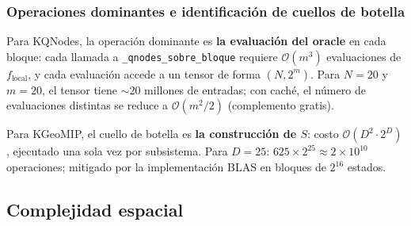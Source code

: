 \subsubsection*{Operaciones dominantes e identificación de cuellos de botella}

Para KQNodes, la operación dominante es \textbf{la evaluación del oracle} en cada bloque:
cada llamada a \texttt{\_qnodes\_sobre\_bloque} requiere $\mathcal{O}(m^3)$ evaluaciones
de $f_{\text{local}}$, y cada evaluación accede a un tensor de forma $(N, 2^m)$.
Para $N=20$ y $m=20$, el tensor tiene $\sim$20 millones de entradas; con caché, el número
de evaluaciones distintas se reduce a $\mathcal{O}(m^2/2)$ (complemento gratis).

Para KGeoMIP, el cuello de botella es \textbf{la construcción de $S$}: costo
$\mathcal{O}(D^2 \cdot 2^D)$, ejecutado una sola vez por subsistema. Para $D=25$:
$625 \times 2^{25} \approx 2 \times 10^{10}$ operaciones; mitigado por la implementación
BLAS en bloques de $2^{16}$ estados.

\subsection{Complejidad espacial}

